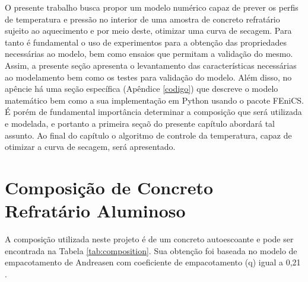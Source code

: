 O presente trabalho busca propor um modelo numérico capaz de prever os perfis de
temperatura e pressão no interior de uma amostra de concreto refratário sujeito
ao aquecimento e por meio deste, otimizar uma curva de secagem. Para tanto é
fundamental o uso de experimentos para a obtenção das propriedades necessárias
ao modelo, bem como ensaios que permitam a validação do mesmo. Assim, a presente
seção apresenta o levantamento das características necessárias ao modelamento
bem como os testes para validação do modelo. Além disso, no apêncie há uma seção
específica (Apêndice \ref{codigo}) que descreve o modelo matemático bem como a
sua implementação em Python usando o pacote FEniCS. É porém de fundamental
importância determinar a composição que será utilizada e modelada, e portanto a
primeira seçaõ do presente capítulo abordará tal assunto. Ao final do capítulo o
algoritmo de controle da temperatura, capaz de otimizar a curva de secagem, será
apresentado.

\section{Composição de Concreto Refratário Aluminoso}
A composição utilizada neste projeto é de um concreto autoescoante e pode ser
encontrada na Tabela \ref{tab:composition}. Sua obtenção foi baseada no modelo
de empacotamento de Andreasen com coeficiente de empacotamento (q) igual a 0,21
\cite{da2015refractory}.

